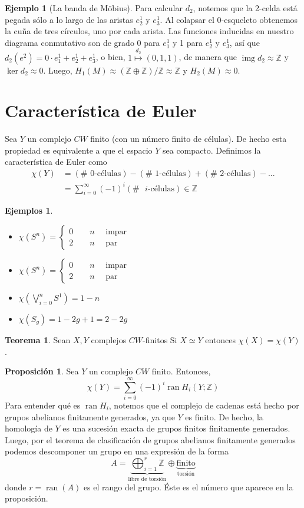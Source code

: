 \documentclass[spanish]{book}
\theoremstyle{definition}
\newtheorem*{teo}{Teorema}
\newtheorem*{prop}{Proposición}
\newtheorem*{ejem}{Ejemplo}
\newtheorem*{ejems}{Ejemplos}
\newcommand{\Z}{\mathbb{Z}}
\DeclareMathOperator{\img}{img}
\DeclareMathOperator{\ran}{ran}
\begin{document}
\begin{ejem}[La banda de Möbius]
	Para calcular $d_2$, notemos que la 2-celda está pegada sólo a lo largo de las aristas $e^1_2$ y $e^1_3$. Al colapsar el 0-esqueleto obtenemos la cuña de tres círculos, uno por cada arista. Las funciones inducidas en nuestro diagrama conmutativo son de grado 0 para $e^1_1$ y 1 para $e^1_2$ y $e^1_3$, así que $d_2(e^2)=0\cdot e^1_1+e^1_2+e^1_3$, o bien, $1\overset{d_2}{\mapsto}(0,1,1)$, de manera que $\img d_2\approx \Z$ y $\ker d_2\approx 0$. Luego, $H_1(M)\approx (\Z\oplus\Z)/\Z\approx \Z$ y $H_2(M)\approx 0$.
\end{ejem}
\section{Característica de Euler}
	Sea $Y$ un complejo $CW$ finito (con un número finito de células). De hecho esta propiedad es equivalente a que el espacio $Y$ sea compacto. Definimos la característica de Euler como
	\begin{align*}
		\chi(Y)&=(\#\text{ 0-células})-(\#\text{ 1-células})+(\#\text{ 2-células})-...\\
		&=\sum_{i=0}^\infty(-1)^i(\#\text{ }i\text{-células})\in\Z
	\end{align*}
	\begin{ejems}\leavevmode
		
		\begin{itemize}
			\item $\chi(S^n)=\begin{cases}0\qquad n\quad\text{ impar}\\2\qquad n\quad\text{ par}\end{cases}$
			\item $\chi(S^n)=\begin{cases}0\qquad n\quad\text{ impar}\\2\qquad n\quad\text{ par}\end{cases}$
			\item $\chi(\bigvee_{i=0}^nS^1)=1-n$
			\item $\chi(S_g)=1-2g+1=2-2g$
		\end{itemize}
	\end{ejems}
	\begin{teo}
		Sean $X,Y$ complejos $CW$-finitos Si $X\simeq Y$ entonces $\chi(X)=\chi(Y)$.
	\end{teo}
	\begin{prop}
		 Sea $Y$ un complejo $CW$ finito. Entonces,
		 \[\chi(Y)=\sum_{i=0}^\infty(-1)^i\ran H_i(Y;\Z)\]
		 Para entender qué es $\ran H_i$, notemos que el complejo de cadenas está hecho por grupos abelianos finitamente generados, ya que $Y$ es finito. De hecho, la homología de $Y$ es una sucesión exacta de grupos finitos finitamente generados. Luego, por el teorema de clasificación de grupos abelianos finitamente generados podemos descomponer un grupo en una expresión de la forma
		 \[A=\underbrace{\bigoplus_{i=1}^r\Z}_\text{libre de torsión}\oplus\underbrace{\text{finito}}_{\text{torsión}}\]
		 donde $r=\ran(A)$ es el rango del grupo. Éste es el número que aparece en la proposición.
	\end{prop}
\end{document}

